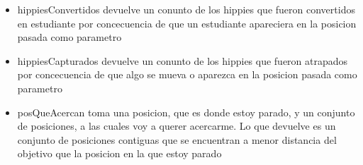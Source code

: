 \documentclass[10pt, a4paper]{article}
\begin{document}
\begin{itemize}
\item hippiesConvertidos devuelve un conunto de los hippies que fueron convertidos en estudiante por concecuencia de que un estudiante apareciera en la posicion pasada como parametro
\item hippiesCapturados devuelve un conunto de los hippies que fueron atrapados por concecuencia de que algo se mueva o aparezca en la posicion pasada como parametro
\item posQueAcercan toma una posicion, que es donde estoy parado, y un conjunto de posiciones, a las cuales voy a querer acercarme. Lo que devuelve es un conjunto de posiciones contiguas que se encuentran a menor distancia del objetivo que la posicion en la que estoy parado

\end{itemize}
\end{document}
